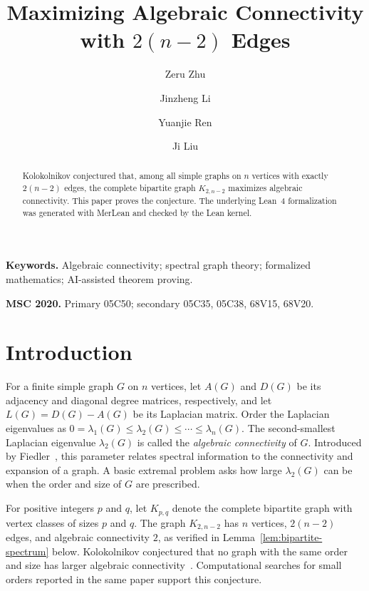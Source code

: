 \documentclass[11pt]{article}
\title{Maximizing Algebraic Connectivity with \(2(n-2)\) Edges}
\author{
Zeru Zhu \and Jinzheng Li \and Yuanjie Ren \and Ji Liu
}
\date{}
\numberwithin{equation}{section}
\theoremstyle{definition}
\theoremstyle{remark}
\newcommand{\ac}{\lambda_2}
\begin{document}
\maketitle
\begingroup
\renewcommand{\thefootnote}{}
\footnotemark
{}
\endgroup
\setcounter{footnote}{0}

\begin{abstract}
Kolokolnikov conjectured that, among all simple graphs on \(n\) vertices
with exactly \(2(n-2)\) edges, the complete bipartite graph \(K_{2,n-2}\)
maximizes algebraic connectivity.  This paper proves the conjecture.
The underlying Lean~4 formalization was
generated with MerLean and checked by the Lean kernel.
\end{abstract}

\noindent\textbf{Keywords.}
Algebraic connectivity; spectral graph theory; formalized mathematics; AI-assisted theorem proving.

\medskip
\noindent\textbf{MSC 2020.}
Primary 05C50; secondary 05C35, 05C38, 68V15, 68V20.

\section{Introduction}\label{sec:introduction}

For a finite simple graph \(G\) on \(n\) vertices, let \(A(G)\) and
\(D(G)\) be its adjacency and diagonal degree matrices, respectively, and
let \(L(G)=D(G)-A(G)\) be its Laplacian matrix.  Order the Laplacian
eigenvalues as
\(0=\lambda_1(G)\le\lambda_2(G)\le\cdots\le\lambda_n(G)\).  The
second-smallest Laplacian eigenvalue \(\lambda_2(G)\) is called the
\emph{algebraic connectivity} of \(G\).  Introduced by
Fiedler~\cite{fiedler1973}, this parameter relates spectral information to
the connectivity and expansion of a graph.  A basic extremal problem asks
how large \(\ac(G)\) can be when the order and size of \(G\) are prescribed.

For positive integers \(p\) and \(q\), let \(K_{p,q}\) denote the complete
bipartite graph with vertex classes of sizes \(p\) and \(q\).
The graph \(K_{2,n-2}\) has \(n\) vertices, \(2(n-2)\) edges, and algebraic
connectivity \(2\), as verified in Lemma~\ref{lem:bipartite-spectrum} below.
Kolokolnikov conjectured that no graph with the same order and size has
larger algebraic connectivity~\cite[Conjecture~1.5]{kolokolnikov2014maximizingalgebraicconnectivitycertain}.
Computational searches for small orders reported in the same paper support
this conjecture.
\end{document}
